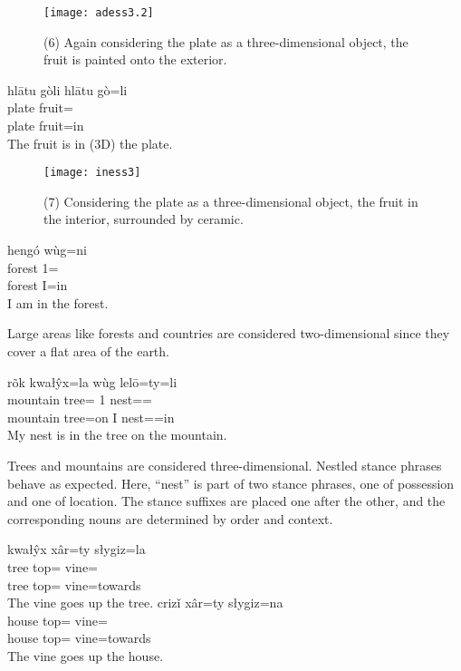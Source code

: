 \begin{figure}[ht]
    \caption*{(6) Again considering the plate as a three-dimensional object, the fruit is painted onto the exterior.}
    \centering
    \texttt{[image: adess3.2]}\label{fig:figure5}
\end{figure}

\begin{exe}
    \ex
    \glt
    hlātu gòli
    \glll
    hlātu gò=li \\
    plate fruit=\InessThree{} \\
    plate fruit=in \\
    \glt
    The fruit is in (3D) the plate.
\end{exe}

\begin{figure}[ht]
    \caption*{(7) Considering the plate as a three-dimensional object, the fruit in the interior, surrounded by ceramic.}
    \centering
    \texttt{[image: iness3]}\label{fig:figure6}
\end{figure}

\newpage

\begin{exe}
    \ex
    \glll
    hengó wùg=ni \\
    forest 1\Sg{}=\InessTwo{}\\
    forest I=in \\
    \glt
    I am in the forest.
\end{exe}

Large areas like forests and countries are considered two-dimensional
since they cover a flat area of the earth.

\begin{exe}
    \ex
    \glll
    rõk kwałŷx=la wùg lelō=ty=li \\
    mountain tree=\AdessThree{} 1\Sg{} nest=\Poss{}=\InessThree{} \\
    mountain tree=on I nest=\Poss{}=in \\
    \glt
    My nest is in the tree on the mountain.
\end{exe}

Trees and mountains are considered three-dimensional.
Nestled stance phrases behave as expected.
Here, ``nest'' is part of two stance phrases,
one of possession and one of location.
The stance suffixes are placed one after the other,
and the corresponding nouns are determined by order and context.

\begin{exe}
    \ex
    \glll
    kwałŷx xâr=ty słygiz=la \\
    tree top=\Poss{} vine=\AdessThree{} \\
    tree top=\Poss{} vine=towards \\
    \glt
    The vine goes up the tree.
    \ex
    \glll
    crizǐ xâr=ty słygiz=na \\
    house top=\Poss{} vine=\AdessTwo{} \\
    house top=\Poss{} vine=towards \\
    \glt
    The vine goes up the house.
\end{exe}


